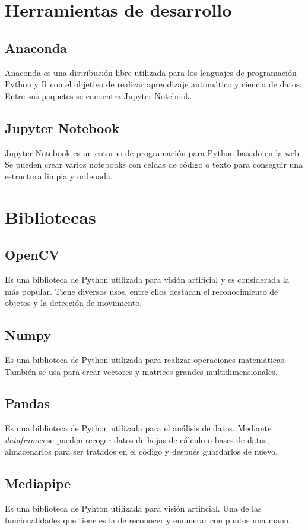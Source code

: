 \section{Herramientas de desarrollo}
\subsection{Anaconda}
Anaconda es una distribución libre utilizada para los lenguajes de programación Python y R con el objetivo de realizar aprendizaje automático y ciencia de datos. Entre sus paquetes se encuentra Jupyter Notebook.

\subsection{Jupyter Notebook}
Jupyter Notebook es un entorno de programación para Python basado en la web. Se pueden crear varios notebooks con celdas de código o texto para conseguir una estructura limpia y ordenada.

\section{Bibliotecas}
\subsection{OpenCV}
Es una biblioteca de Python utilizada para visión artificial y es considerada la más popular. Tiene diversos usos, entre ellos destacan el reconocimiento de objetos y la detección de movimiento.

\subsection{Numpy}
Es una biblioteca de Python utilizada para realizar operaciones matemáticas. También se usa para crear vectores y matrices grandes multidimensionales.

\subsection{Pandas}
Es una biblioteca de Python utilizada para el análisis de datos. Mediante \textit{dataframes} se pueden recoger datos de hojas de cálculo o bases de datos, almacenarlos para ser tratados en el código y después guardarlos de nuevo.

\subsection{Mediapipe}
Es una biblioteca de Pyhton utilizada para visión artificial. Una de las funcionalidades que tiene es la de reconocer y enumerar con puntos una mano.

